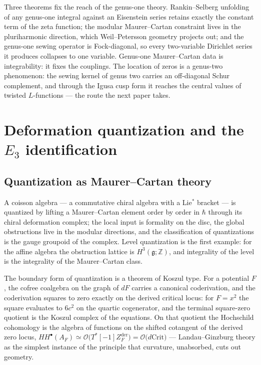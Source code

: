 \documentclass[11pt]{amsart}
\numberwithin{equation}{section}
\theoremstyle{plain}
\theoremstyle{definition}
\theoremstyle{remark}
\newcommand{\bZ}{\mathbb{Z}}
\newcommand{\fg}{\mathfrak{g}}
\begin{document}
Three theorems fix the reach of the genus-one theory. Rankin--Selberg
unfolding of any genus-one integral against an Eisenstein series
retains exactly the constant term of the zeta function; the modular
Maurer--Cartan constraint lives in the pluriharmonic direction, which
Weil--Petersson geometry projects out; and the genus-one sewing
operator is Fock-diagonal, so every two-variable Dirichlet series it
produces collapses to one variable. Genus-one Maurer--Cartan data is
integrability: it fixes the couplings. The location of zeros is a
genus-two phenomenon: the sewing kernel of genus two carries an
off-diagonal Schur complement, and through the Igusa cusp form it
reaches the central values of twisted $L$-functions --- the route the
next paper takes.

\section{Deformation quantization and the $E_3$ identification}
\label{sec:E3}

\subsection{Quantization as Maurer--Cartan theory}

A coisson algebra --- a commutative chiral algebra with a Lie${}^{*}$
bracket --- is quantized by lifting a Maurer--Cartan element order by
order in $\hbar$ through its chiral deformation complex; the local
input is formality on the disc, the global obstructions live in the
modular directions, and the classification of quantizations is the
gauge groupoid of the complex. Level quantization is the first
example: for the affine algebra the obstruction lattice is
$H^{3}(\fg;\bZ)$, and integrality of the level is the integrality of
the Maurer--Cartan class.

The boundary form of quantization is a theorem of Koszul type. For a
potential $F$, the cofree coalgebra on the graph of $dF$ carries a
canonical coderivation, and the coderivation squares to zero exactly
on the derived critical locus: for $F=x^{2}$ the square evaluates to
$6c^{2}$ on the quartic cogenerator, and the terminal square-zero
quotient is the Koszul complex of the equations. On that quotient the
Hochschild cohomology is the algebra of functions on the shifted
cotangent of the derived zero locus,
$HH^{\bullet}(A_F)\simeq\mathcal{O}\bigl(T^{*}[-1]Z_F^{\mathrm{der}}
\bigr)=\mathcal{O}\bigl(d\mathrm{Crit}\bigr)$ ---
Landau--Ginzburg theory as the simplest instance of the principle
that curvature, unabsorbed, cuts out geometry.
\end{document}
